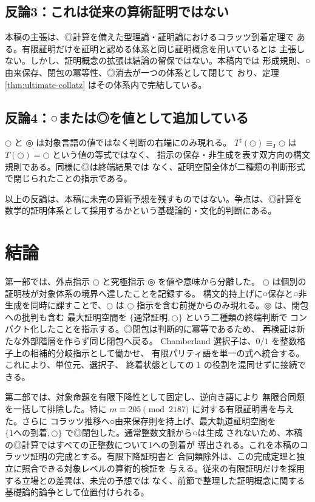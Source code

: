 \documentclass[a4paper,11pt]{ltjsarticle}
\theoremstyle{definition}
\theoremstyle{plain}
\newcommand{\dfix}{\mathord{\text{○}}}
\newcommand{\udfix}{\mathord{\text{◎}}}
\newcommand{\JTeq}{\equiv_{\mathrm{J}}}
\newcommand{\1}{\mathbf{1}}
\begin{document}
\subsection{反論3：これは従来の算術証明ではない}

本稿の主張は、◎計算を備えた型理論・証明論におけるコラッツ到着定理で
ある。有限証明だけを証明と認める体系と同じ証明概念を用いているとは
主張しない。しかし、証明概念の拡張は結論の留保ではない。本稿内では
形成規則、○由来保存、閉包の冪等性、◎消去が一つの体系として閉じて
おり、定理 \ref{thm:ultimate-collatz} はその体系内で完結している。

\subsection{反論4：○または◎を値として追加している}

$\dfix$ と $\udfix$ は対象言語の値ではなく判断の右端にのみ現れる。
$T^\sharp(\dfix)\JTeq\dfix$ は $T(\dfix)=\dfix$ という値の等式ではなく、
指示の保存・非生成を表す双方向の構文規則である。同様に◎は終端結果では
なく、証明空間全体が二種類の判断形式で閉じられたことの指示である。

以上の反論は、本稿に未完の算術予想を残すものではない。争点は、◎計算を
数学的証明体系として採用するかという基礎論的・文化的判断にある。

\section{結論}

第一部では、外点指示 $\dfix$ と究極指示 $\udfix$ を値や意味から分離した。
$\dfix$ は個別の証明枝が対象体系の境界へ達したことを記録する。
構文的持上げに○保存と○非生成を同時に課すことで、$\dfix$ は
$\dfix$ 指示を含む前提からのみ現れる。$\udfix$ は、閉包への批判も含む
最大証明空間を $\{\text{通常証明},\dfix\}$ という二種類の終端判断で
コンパクト化したことを指示する。◎閉包は判断的に冪等であるため、
再検証は新たな外部階層を作らず同じ閉包へ戻る。
Chamberland 選択子は、$0/1$ を整数格子上の相補的分岐指示として働かせ、
有限パリティ語を単一の式へ統合する。これにより、単位元、選択子、
終着状態としての $1$ の役割を混同せずに接続できる。

第二部では、対象命題を有限下降性として固定し、逆向き語により
無限合同類を一括して排除した。特に
$m\equiv205\pmod{2187}$ に対する有限証明書を与えた。さらに
コラッツ推移へ○由来保存則を持上げ、最大軌道証明空間を
$\{\text{1への到着},\dfix\}$ で◎閉包した。通常整数文脈から○は生成
されないため、本稿の◎計算ではすべての正整数について1への到着が
導出される。これを本稿のコラッツ証明の完成とする。有限下降証明書と
合同類除外は、この完成定理と独立に照合できる対象レベルの算術的検証を
与える。従来の有限証明だけを採用する立場との差異は、未完の予想では
なく、前節で整理した証明概念に関する基礎論的論争として位置付けられる。
\end{document}
